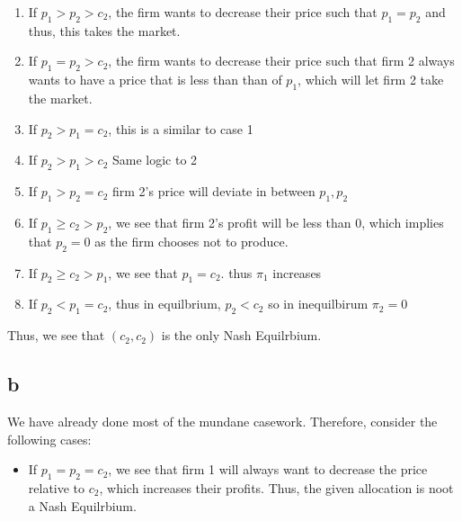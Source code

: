 \documentclass[11pt]{article}
\begin{document}
\begin{enumerate}
    \item If $p_1 > p_2 > c_2$, the firm wants to decrease their price such that $p_1 = p_2$ and thus, this takes the market. 
    \item If $p_1 = p_2 > c_2$, the firm wants to decrease their price such that firm 2 always wants to have a price that is less than than of $p_1$, which will let firm 2 take the market.
    \item If $p_2 > p_1 = c_2$, this is a similar to case 1
    \item If $p_2 > p_1 > c_2$ Same logic to 2 
    \item If $p_1 > p_2 = c_2$ firm 2's price will deviate in between $p_1, p_2$
    \item If $p_1 \geq c_2 > p_2$, we see that firm 2's profit will be less than 0, which implies that $p_2 = 0$ as the firm chooses not to produce. 
    \item If $p_2 \geq c_2 > p_1$, we see that $p_1 = c_2$. thus $\pi_1$ increases
    \item If $p_2 < p_1 = c_2$, thus in equilbrium, $p_2< c_2$ so in inequilbirum $\pi_2 = 0$
\end{enumerate}
Thus, we see that $(c_2, c_2)$ is the only Nash Equilrbium.
\subsection*{b}
We have already done most of the mundane casework. Therefore, consider the following cases:
\begin{itemize}
    \item If $p_1 = p_2 = c_2$, we see that firm 1 will always want to decrease the price relative to $c_2$, which increases their profits. Thus, the given allocation is noot a Nash Equilrbium.  
\end{itemize}
\end{document}
